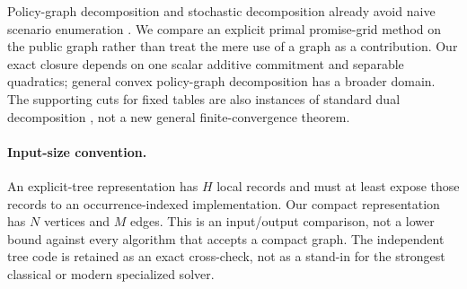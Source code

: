 Policy-graph decomposition and stochastic decomposition already avoid naive scenario enumeration \citep{PereiraPinto1991,Girardeau2015,Dowson2020}. We compare an explicit primal promise-grid method on the public graph rather than treat the mere use of a graph as a contribution. Our exact closure depends on one scalar additive commitment and separable quadratics; general convex policy-graph decomposition has a broader domain. The supporting cuts for fixed tables are also instances of standard dual decomposition \citep{Benders1962,BoydVandenberghe2004}, not a new general finite-convergence theorem.

\paragraph{Input-size convention.}
An explicit-tree representation has $H$ local records and must at least expose those records to an occurrence-indexed implementation. Our compact representation has $N$ vertices and $M$ edges. This is an input/output comparison, not a lower bound against every algorithm that accepts a compact graph. The independent tree code is retained as an exact cross-check, not as a stand-in for the strongest classical or modern specialized solver.